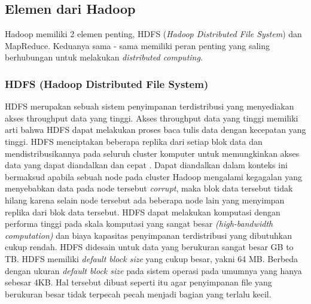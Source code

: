 	\subsection{Elemen dari Hadoop}
	Hadoop memiliki 2 elemen penting, HDFS (\textit{Hadoop Distributed File System}) dan MapReduce. Keduanya sama - sama memiliki peran penting yang saling berhubungan untuk melakukan \textit{distributed computing}.
		\subsubsection{HDFS (Hadoop Distributed File System)}

HDFS merupakan sebuah sistem penyimpanan terdistribusi yang menyediakan akses throughput data yang tinggi. Akses throughput data yang tinggi memiliki arti bahwa HDFS dapat melakukan proses baca tulis data dengan kecepatan yang tinggi. HDFS menciptakan beberapa replika dari setiap blok data dan mendistribusikannya pada seluruh cluster komputer untuk memungkinkan akses data yang dapat diandalkan dan cepat \cite{Holmes:2012:HP:2543981}. Dapat diandalkan dalam konteks ini bermaksud apabila sebuah node pada cluster Hadoop mengalami kegagalan yang menyebabkan data pada node tersebut \textit{corrupt}, maka blok data tersebut tidak hilang karena selain node tersebut ada beberapa node lain yang menyimpan replika dari blok data tersebut. HDFS dapat melakukan komputasi dengan performa tinggi pada skala komputasi yang sangat besar \textit{(high-bandwidth computation)} dan biaya kapasitas penyimpanan terdistribusi yang dibutuhkan cukup rendah. HDFS didesain untuk data yang berukuran sangat besar GB to TB. HDFS memiliki \textit{default block size} yang cukup besar, yakni 64 MB. Berbeda dengan ukuran \textit{default block size} pada sistem operasi pada umumnya yang hanya sebesar 4KB. Hal tersebut dibuat seperti itu agar penyimpanan file yang berukuran besar tidak terpecah pecah menjadi bagian yang terlalu kecil.

